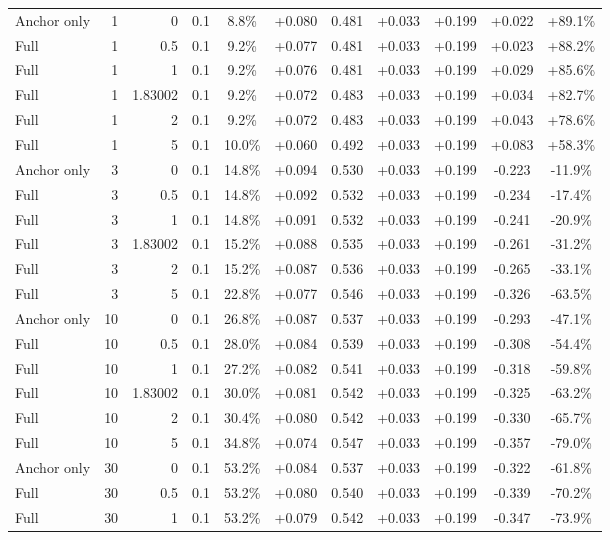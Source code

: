\begin{table}[htbp]
\begin{tabular}{lrrrccccccc}
Anchor only & 1 & 0 & 0.1 & 8.8\% & +0.080 & 0.481 & +0.033 & +0.199 & +0.022 & +89.1\% \\
Full & 1 & 0.5 & 0.1 & 9.2\% & +0.077 & 0.481 & +0.033 & +0.199 & +0.023 & +88.2\% \\
Full & 1 & 1 & 0.1 & 9.2\% & +0.076 & 0.481 & +0.033 & +0.199 & +0.029 & +85.6\% \\
Full & 1 & 1.83002 & 0.1 & 9.2\% & +0.072 & 0.483 & +0.033 & +0.199 & +0.034 & +82.7\% \\
Full & 1 & 2 & 0.1 & 9.2\% & +0.072 & 0.483 & +0.033 & +0.199 & +0.043 & +78.6\% \\
Full & 1 & 5 & 0.1 & 10.0\% & +0.060 & 0.492 & +0.033 & +0.199 & +0.083 & +58.3\% \\
Anchor only & 3 & 0 & 0.1 & 14.8\% & +0.094 & 0.530 & +0.033 & +0.199 & -0.223 & -11.9\% \\
Full & 3 & 0.5 & 0.1 & 14.8\% & +0.092 & 0.532 & +0.033 & +0.199 & -0.234 & -17.4\% \\
Full & 3 & 1 & 0.1 & 14.8\% & +0.091 & 0.532 & +0.033 & +0.199 & -0.241 & -20.9\% \\
Full & 3 & 1.83002 & 0.1 & 15.2\% & +0.088 & 0.535 & +0.033 & +0.199 & -0.261 & -31.2\% \\
Full & 3 & 2 & 0.1 & 15.2\% & +0.087 & 0.536 & +0.033 & +0.199 & -0.265 & -33.1\% \\
Full & 3 & 5 & 0.1 & 22.8\% & +0.077 & 0.546 & +0.033 & +0.199 & -0.326 & -63.5\% \\
Anchor only & 10 & 0 & 0.1 & 26.8\% & +0.087 & 0.537 & +0.033 & +0.199 & -0.293 & -47.1\% \\
Full & 10 & 0.5 & 0.1 & 28.0\% & +0.084 & 0.539 & +0.033 & +0.199 & -0.308 & -54.4\% \\
Full & 10 & 1 & 0.1 & 27.2\% & +0.082 & 0.541 & +0.033 & +0.199 & -0.318 & -59.8\% \\
Full & 10 & 1.83002 & 0.1 & 30.0\% & +0.081 & 0.542 & +0.033 & +0.199 & -0.325 & -63.2\% \\
Full & 10 & 2 & 0.1 & 30.4\% & +0.080 & 0.542 & +0.033 & +0.199 & -0.330 & -65.7\% \\
Full & 10 & 5 & 0.1 & 34.8\% & +0.074 & 0.547 & +0.033 & +0.199 & -0.357 & -79.0\% \\
Anchor only & 30 & 0 & 0.1 & 53.2\% & +0.084 & 0.537 & +0.033 & +0.199 & -0.322 & -61.8\% \\
Full & 30 & 0.5 & 0.1 & 53.2\% & +0.080 & 0.540 & +0.033 & +0.199 & -0.339 & -70.2\% \\
Full & 30 & 1 & 0.1 & 53.2\% & +0.079 & 0.542 & +0.033 & +0.199 & -0.347 & -73.9\% \\

\end{tabular}
\end{table}

